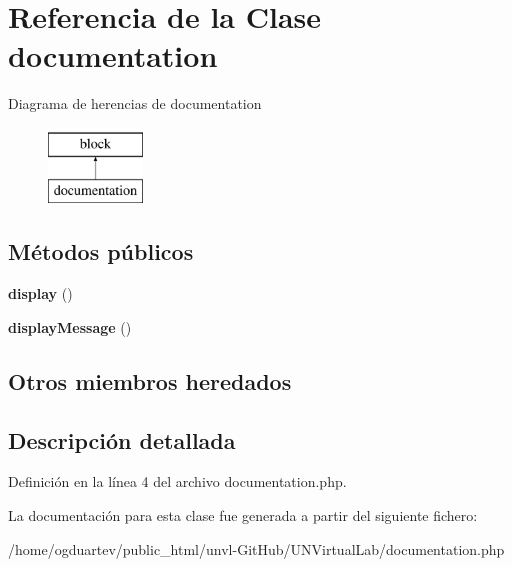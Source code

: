 \hypertarget{classdocumentation}{}\section{Referencia de la Clase documentation}
\label{classdocumentation}
Diagrama de herencias de documentation\begin{figure}[H]
\begin{center}
\leavevmode
\includegraphics[height=2.000000cm]{classdocumentation}
\end{center}
\end{figure}
\subsection*{Métodos públicos}
\begin{DoxyCompactItemize}
\item 
\mbox{\label{classdocumentation_a57d71d7b60444440fa1a4aba1135a751}} 
{\bfseries display} ()
\item 
\mbox{\label{classdocumentation_ad83e35dbf443ee7ee2b6efafcc7f36a6}} 
{\bfseries display\+Message} ()
\end{DoxyCompactItemize}
\subsection*{Otros miembros heredados}


\subsection{Descripción detallada}


Definición en la línea 4 del archivo documentation.\+php.



La documentación para esta clase fue generada a partir del siguiente fichero\+:\begin{DoxyCompactItemize}
\item 
/home/ogduartev/public\+\_\+html/unvl-\/\+Git\+Hub/\+U\+N\+Virtual\+Lab/documentation.\+php\end{DoxyCompactItemize}
